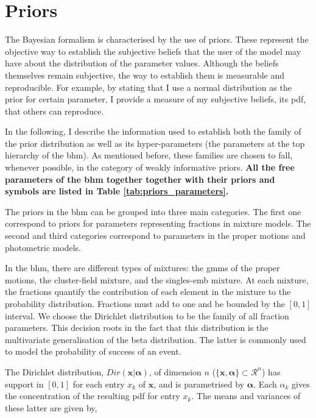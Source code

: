 \section{Priors}
\label{sect:priors}
The Bayesian formalism is characterised by the use of priors. These represent the objective way to establish the subjective beliefs that the user of the model may have about the distribution of the parameter values. Although the beliefs themselves remain subjective, the way to establish them is measurable and reproducible. For example, by stating that I use a normal distribution as the prior for certain parameter, I provide a measure of my subjective beliefs, its \gls{pdf}, that others can reproduce.

In the following, I describe the information used to establish both the family of the prior distribution as well as its hyper-parameters (the parameters at the top hierarchy of the \gls{bhm}). As mentioned before, these families are chosen to fall, whenever possible, in the category of weakly informative priors. \textbf{All the free parameters of the \gls{bhm} together together with their priors and symbols are listed in Table \ref{tab:priors_parameters}.}


The priors in the \gls{bhm} can be grouped into three main categories. The first one correspond to priors for parameters representing fractions in mixture models. The second and third categories correspond to parameters in the proper motions and photometric models. 

In the \gls{bhm}, there are different types of mixtures: the \glspl{gmm} of the proper motions, the cluster-field mixture, and the singles-\gls{emb} mixture. At each mixture, the fractions quantify the contribution of each element in the mixture to the probability distribution. Fractions must add to one and be bounded by the $[0,1]$ interval.  We choose the Dirichlet distribution to be the family of all fraction parameters. This decision roots in the fact that this distribution is the multivariate generalisation of the beta distribution. The latter is commonly used to model the probability of success of an event.

{The Dirichlet distribution, $Dir(\mathbf{x}|\boldsymbol{\alpha})$, of dimension $n$ ($\{\mathbf{x},\boldsymbol{\alpha}\} \subset \mathcal{R}^n$) has support in $[0,1]$ for each entry $x_k$ of $\mathbf{x}$, and is parametrised by $\boldsymbol{\alpha}$. Each $\alpha_k$ gives the concentration of the resulting \gls{pdf} for entry $x_k$. The means and variances of these latter are given by,}

